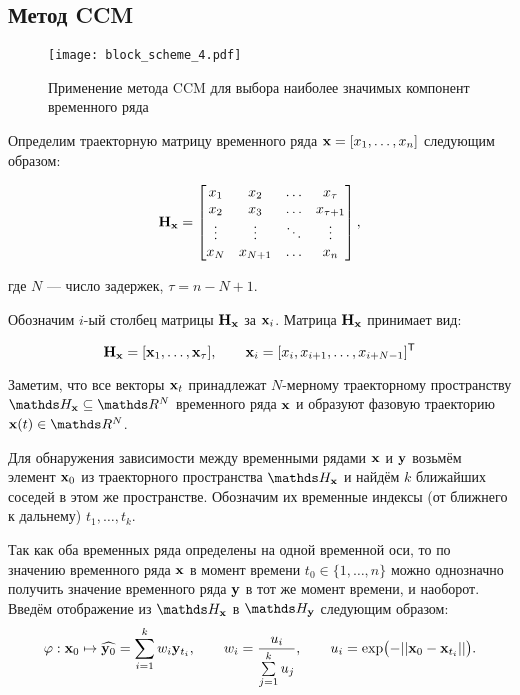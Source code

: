 \documentclass[a4paper, 12pt]{article}
\begin{document}
\subsection{Метод CCM}
\begin{figure}[bhtp]
	\texttt{[image: block\_scheme\_4.pdf]}
	\caption{Применение метода CCM для выбора наиболее значимых компонент временного ряда}
	\label{fig:schema}
\end{figure}

Определим траекторную матрицу временного ряда $\mathbf{x} = [x_1, \ldots, x_n]$ следующим образом: 

\begin{equation*} \label{eq:traj_mat}
	\mathbf{H}_{\mathbf{x}} = \begin{bmatrix}
		x_1 & x_2 & \ldots & x_{\tau} \\
		x_2 & x_3 & \ldots & x_{\tau+1} \\
		\vdots & \vdots & \ddots & \vdots \\
		x_{N} & x_{N+1} & \ldots & x_n
	\end{bmatrix}, 
\end{equation*} 

где $N$ --- число задержек, $\tau = n - N + 1$.

Обозначим $i\text{-ый}$ столбец матрицы $\mathbf{H}_{\mathbf{x}}$ за $\mathbf{x}_i$. 
Матрица $\mathbf{H}_{\mathbf{x}}$ принимает вид:

\begin{equation*} \label{eq:traj_mat_short}
	\mathbf{H}_{\mathbf{x}} = [\mathbf{x}_1, \ldots, \mathbf{x}_{\tau}], \qquad \mathbf{x}_i = [x_i, x_{i+1}, \ldots, x_{i+N-1}]^{\mathsf{T}} 
\end{equation*}

Заметим, что все векторы $\mathbf{x}_t$ принадлежат $N\text{-мерному}$ траекторному пространству $\dH_{\bx} \subseteq \dR^N$ временного ряда $\mathbf{x}$ и образуют фазовую траекторию $\bx(t) \in \dR^N$.

Для обнаружения зависимости между временными рядами $\mathbf{x}$ и $\mathbf{y}$ возьмём элемент $\mathbf{x}_0$ из траекторного пространства $\dH_{\bx}$ и найдём $k$ ближайших соседей в этом же пространстве. 
Обозначим их временные индексы (от ближнего к дальнему) $t_1, \ldots, t_k$.

Так как оба временных ряда определены на одной временной оси, то по значению временного ряда $\mathbf{x}$ в момент времени $t_0 \in \{ 1, \ldots, n\}$ можно однозначно получить значение временного ряда $\mathbf{y}$ в тот же момент времени, и наоборот. 
Введём отображение из $\dH_{\bx}$ в $\dH_{\by}$ следующим образом: 
$$ \varphi: \mathbf{x}_0 \mapsto \widehat{\mathbf{y}_0} = \sum\limits_{i=1}^k w_i \mathbf{y}_{t_i}, \qquad 
w_i = \dfrac{u_i}{\sum\limits_{j=1}^k u_j}, \qquad
u_i = \exp \bigl( -||\mathbf{x}_0 - \mathbf{x}_{t_i}|| \bigr).$$
\end{document}
